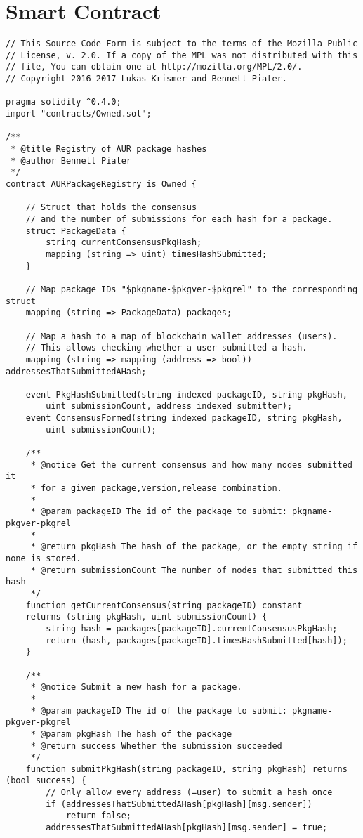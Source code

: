 \section{Smart Contract}\label{sec:contract}
\begin{verbatim}
// This Source Code Form is subject to the terms of the Mozilla Public
// License, v. 2.0. If a copy of the MPL was not distributed with this
// file, You can obtain one at http://mozilla.org/MPL/2.0/.
// Copyright 2016-2017 Lukas Krismer and Bennett Piater.

pragma solidity ^0.4.0;
import "contracts/Owned.sol";

/**
 * @title Registry of AUR package hashes
 * @author Bennett Piater
 */
contract AURPackageRegistry is Owned {

    // Struct that holds the consensus
    // and the number of submissions for each hash for a package.
    struct PackageData {
        string currentConsensusPkgHash;
        mapping (string => uint) timesHashSubmitted;
    }

    // Map package IDs "$pkgname-$pkgver-$pkgrel" to the corresponding struct
    mapping (string => PackageData) packages;

    // Map a hash to a map of blockchain wallet addresses (users).
    // This allows checking whether a user submitted a hash.
    mapping (string => mapping (address => bool)) addressesThatSubmittedAHash;

    event PkgHashSubmitted(string indexed packageID, string pkgHash,
        uint submissionCount, address indexed submitter);
    event ConsensusFormed(string indexed packageID, string pkgHash,
        uint submissionCount);

    /**
     * @notice Get the current consensus and how many nodes submitted it
     * for a given package,version,release combination.
     *
     * @param packageID The id of the package to submit: pkgname-pkgver-pkgrel
     *
     * @return pkgHash The hash of the package, or the empty string if none is stored.
     * @return submissionCount The number of nodes that submitted this hash
     */
    function getCurrentConsensus(string packageID) constant
    returns (string pkgHash, uint submissionCount) {
        string hash = packages[packageID].currentConsensusPkgHash;
        return (hash, packages[packageID].timesHashSubmitted[hash]);
    }

    /**
     * @notice Submit a new hash for a package.
     *
     * @param packageID The id of the package to submit: pkgname-pkgver-pkgrel
     * @param pkgHash The hash of the package
     * @return success Whether the submission succeeded
     */
    function submitPkgHash(string packageID, string pkgHash) returns (bool success) {
        // Only allow every address (=user) to submit a hash once
        if (addressesThatSubmittedAHash[pkgHash][msg.sender])
            return false;
        addressesThatSubmittedAHash[pkgHash][msg.sender] = true;


\end{verbatim}
